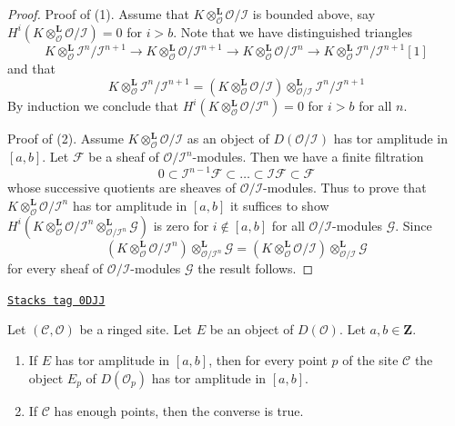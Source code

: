 \begin{proof}
Proof of (1). Assume that
$K \otimes_\mathcal{O}^\mathbf{L} \mathcal{O}/\mathcal{I}$
is bounded above, say
$H^i(K \otimes_\mathcal{O}^\mathbf{L} \mathcal{O}/\mathcal{I}) = 0$
for $i > b$. Note that we have distinguished triangles
$$
K \otimes_\mathcal{O}^\mathbf{L}
\mathcal{I}^n/\mathcal{I}^{n + 1} \to
K \otimes_\mathcal{O}^\mathbf{L}
\mathcal{O}/\mathcal{I}^{n + 1} \to
K \otimes_\mathcal{O}^\mathbf{L}
\mathcal{O}/\mathcal{I}^n \to
K \otimes_\mathcal{O}^\mathbf{L}
\mathcal{I}^n/\mathcal{I}^{n + 1}[1]
$$
and that
$$
K \otimes_\mathcal{O}^\mathbf{L}
\mathcal{I}^n/\mathcal{I}^{n + 1} =
\left(
K \otimes_\mathcal{O}^\mathbf{L}
\mathcal{O}/\mathcal{I}\right)
\otimes_{\mathcal{O}/\mathcal{I}}^\mathbf{L}
\mathcal{I}^n/\mathcal{I}^{n + 1}
$$
By induction we conclude that
$H^i(K \otimes_\mathcal{O}^\mathbf{L} \mathcal{O}/\mathcal{I}^n) = 0$
for $i > b$ for all $n$.

\medskip\noindent
Proof of (2). Assume $K \otimes_\mathcal{O}^\mathbf{L} \mathcal{O}/\mathcal{I}$
as an object of $D(\mathcal{O}/\mathcal{I})$ has tor amplitude in $[a, b]$.
Let $\mathcal{F}$ be a sheaf of $\mathcal{O}/\mathcal{I}^n$-modules.
Then we have a finite filtration
$$
0 \subset \mathcal{I}^{n - 1}\mathcal{F} \subset \ldots
\subset \mathcal{I}\mathcal{F} \subset \mathcal{F}
$$
whose successive quotients are sheaves of $\mathcal{O}/\mathcal{I}$-modules.
Thus to prove that $K \otimes_\mathcal{O}^\mathbf{L} \mathcal{O}/\mathcal{I}^n$
has tor amplitude in $[a, b]$ it suffices to show
$H^i(K \otimes_\mathcal{O}^\mathbf{L} \mathcal{O}/\mathcal{I}^n
\otimes_{\mathcal{O}/\mathcal{I}^n}^\mathbf{L} \mathcal{G})$
is zero for $i \not \in [a, b]$ for all $\mathcal{O}/\mathcal{I}$-modules
$\mathcal{G}$. Since
$$
\left(K \otimes_\mathcal{O}^\mathbf{L} \mathcal{O}/\mathcal{I}^n\right)
\otimes_{\mathcal{O}/\mathcal{I}^n}^\mathbf{L} \mathcal{G}
=
\left(K \otimes_\mathcal{O}^\mathbf{L} \mathcal{O}/\mathcal{I}\right)
\otimes_{\mathcal{O}/\mathcal{I}}^\mathbf{L} \mathcal{G}
$$
for every sheaf of $\mathcal{O}/\mathcal{I}$-modules $\mathcal{G}$
the result follows.
\end{proof}

\begin{lemma}
\label{sites-cohomology-lemma-tor-amplitude-stalk}
\href{https://stacks.math.columbia.edu/tag/0DJJ}{\texttt{Stacks tag 0DJJ}}

Let $(\mathcal{C}, \mathcal{O})$ be a ringed site.
Let $E$ be an object of $D(\mathcal{O})$.
Let $a, b \in \mathbf{Z}$.
\begin{enumerate}
\item If $E$ has tor amplitude in $[a, b]$, then for every point $p$
of the site $\mathcal{C}$ the object $E_p$ of $D(\mathcal{O}_p)$
has tor amplitude in $[a, b]$.
\item If $\mathcal{C}$ has enough points, then the converse is true.
\end{enumerate}
\end{lemma}

